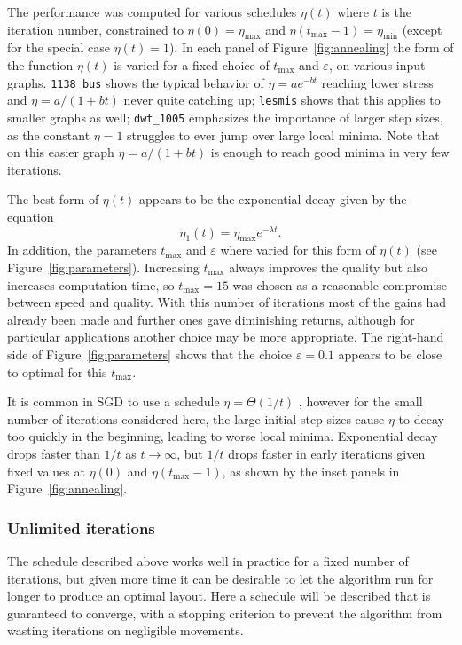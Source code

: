 The performance was computed for various schedules $\eta(t)$ where $t$ is the iteration number, constrained to $\eta(0)=\eta_{\max}$ and $\eta(t_\mathrm{max}-1)=\eta_{\min}$ (except for the special case $\eta(t)=1$).
In each panel of Figure~\ref{fig:annealing} the form of the function $\eta(t)$ is varied for a fixed choice of $t_\mathrm{max}$ and $\varepsilon$, on various input graphs.
\texttt{1138\_bus} shows the typical behavior of $\eta= ae^{-bt}$ reaching lower stress and $\eta= a/(1+bt)$ never quite catching up; \texttt{lesmis} shows that this applies to smaller graphs as well; \texttt{dwt\_1005} emphasizes the importance of larger step sizes, as the constant $\eta=1$ struggles to ever jump over large local minima. Note that on this easier graph $\eta=a/(1+bt)$ is enough to reach good minima in very few iterations.

The best form of $\eta(t)$ appears to be the exponential decay given by the equation
\begin{equation}
  \eta_1(t) = \eta_{\max} e^{-\lambda t}.
  \label{eq:expodecay}
\end{equation}
In addition, the parameters $t_\mathrm{max}$ and $\varepsilon$ where varied for this form of $\eta(t)$ (see Figure~\ref{fig:parameters}).
Increasing $t_\mathrm{max}$ always improves the quality but also increases computation time, so $t_\mathrm{max}=15$ was chosen as a reasonable compromise between speed and quality.
With this number of iterations most of the gains had already been made and further ones gave diminishing returns, although for particular applications another choice may be more appropriate.
The right-hand side of Figure~\ref{fig:parameters} shows that the choice $\varepsilon=0.1$ appears to be close to optimal for this $t_{\max}$.

It is common in SGD to use a schedule
$\eta = \Theta(1/t)$ \citep{Darken1992},
however for the small number of iterations considered here, the large initial step sizes cause $\eta$ to decay too quickly in the beginning, leading to worse local minima. 
Exponential decay drops faster than $1/t$ as $t\rightarrow\infty$, but $1/t$ drops faster in early iterations given fixed values at $\eta(0)$ and $\eta(t_{\max}-1)$, as shown by the inset panels in Figure~\ref{fig:annealing}.

\subsubsection{Unlimited iterations}
The schedule described above works well in practice for a fixed number of iterations, but given more time it can be desirable to let the algorithm run for longer to produce an optimal layout.
Here a schedule will be described that is guaranteed to converge, with a stopping criterion to prevent the algorithm from wasting iterations on negligible movements.

